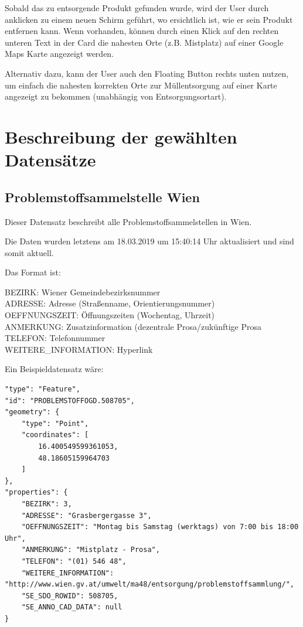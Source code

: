 \documentclass[12pt, a4paper]{scrreprt}
\begin{document}
Sobald das zu entsorgende Produkt gefunden wurde, wird der User durch anklicken zu einem neuen Schirm geführt, wo ersichtlich ist, wie er sein Produkt entfernen kann. Wenn vorhanden, können durch einen Klick auf den rechten unteren Text in der Card die nahesten Orte (z.B. Mistplatz) auf einer Google Maps Karte angezeigt werden.

Alternativ dazu, kann der User auch den Floating Button rechts unten nutzen, um einfach die nahesten korrekten Orte zur Müllentsorgung auf einer Karte angezeigt zu bekommen (unabhängig von Entsorgungsortart).

\section{Beschreibung der gewählten Datensätze}
\subsection{Problemstoffsammelstelle Wien \cite{problemstoffsammelstellen}}
    Dieser Datensatz beschreibt alle Problemstoffsammelstellen in Wien.

    Die Daten wurden letztens am 18.03.2019 um 15:40:14 Uhr aktualisiert und sind somit aktuell.

    Das Format ist:
    \begin{tcolorbox}
        BEZIRK: Wiener Gemeindebezirksnummer\\
        ADRESSE: Adresse (Straßenname, Orientierungsnummer)\\
        OEFFNUNGSZEIT: Öffnungszeiten (Wochentag, Uhrzeit)\\
        ANMERKUNG: Zusatzinformation (dezentrale Prosa/zukünftige Prosa\\
        TELEFON: Telefonnummer\\
        WEITERE\_INFORMATION: Hyperlink 
    \end{tcolorbox}
    
    Ein Beispieldatensatz wäre:
    \begin{lstlisting}
"type": "Feature",
"id": "PROBLEMSTOFFOGD.508705",
"geometry": {
    "type": "Point",
    "coordinates": [
        16.400549599361053,
        48.18605159964703
    ]
},
"properties": {
    "BEZIRK": 3,
    "ADRESSE": "Grasbergergasse 3",
    "OEFFNUNGSZEIT": "Montag bis Samstag (werktags) von 7:00 bis 18:00 Uhr",
    "ANMERKUNG": "Mistplatz - Prosa",
    "TELEFON": "(01) 546 48",
    "WEITERE_INFORMATION": "http://www.wien.gv.at/umwelt/ma48/entsorgung/problemstoffsammlung/",
    "SE_SDO_ROWID": 508705,
    "SE_ANNO_CAD_DATA": null
}
    \end{lstlisting}
\end{document}
